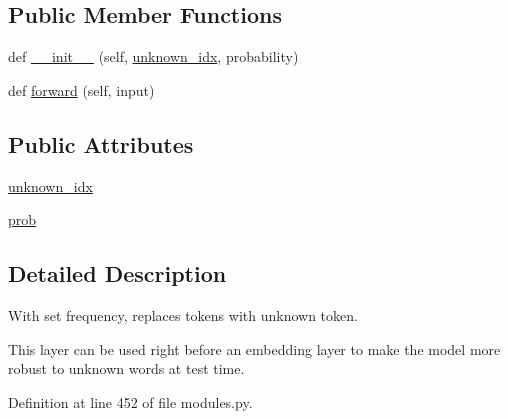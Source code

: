 \subsection*{Public Member Functions}
\begin{DoxyCompactItemize}
\item 
def \hyperlink{classprojects_1_1controllable__dialogue_1_1controllable__seq2seq_1_1modules_1_1UnknownDropout_a372e777d8028c259002dccd0477c6714}{\+\_\+\+\_\+init\+\_\+\+\_\+} (self, \hyperlink{classprojects_1_1controllable__dialogue_1_1controllable__seq2seq_1_1modules_1_1UnknownDropout_a5e7e2f4a3eb4ae3893445b792ce94f20}{unknown\+\_\+idx}, probability)
\item 
def \hyperlink{classprojects_1_1controllable__dialogue_1_1controllable__seq2seq_1_1modules_1_1UnknownDropout_aff3bc451d1729384ba040a0ea1e5443c}{forward} (self, input)
\end{DoxyCompactItemize}
\subsection*{Public Attributes}
\begin{DoxyCompactItemize}
\item 
\hyperlink{classprojects_1_1controllable__dialogue_1_1controllable__seq2seq_1_1modules_1_1UnknownDropout_a5e7e2f4a3eb4ae3893445b792ce94f20}{unknown\+\_\+idx}
\item 
\hyperlink{classprojects_1_1controllable__dialogue_1_1controllable__seq2seq_1_1modules_1_1UnknownDropout_a1563638f138b25ea2911b07ba089c800}{prob}
\end{DoxyCompactItemize}


\subsection{Detailed Description}
\begin{DoxyVerb}With set frequency, replaces tokens with unknown token.

This layer can be used right before an embedding layer to make the model more robust
to unknown words at test time.
\end{DoxyVerb}
 

Definition at line 452 of file modules.\+py.



